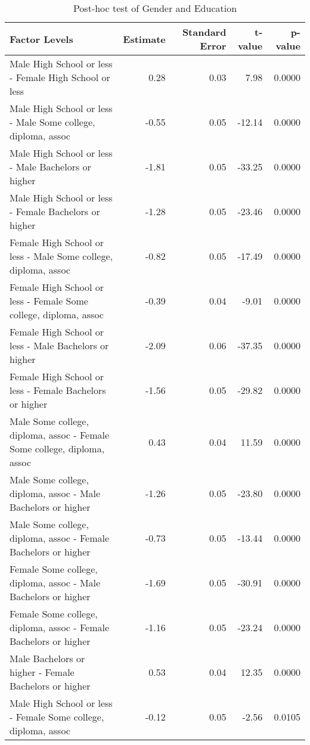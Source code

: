 \begin{table}[H]
\footnotesize
\centering
\begin{tabular}{lrrrr}
  \hline
Factor Levels & Estimate & Standard Error & t-value & p-value \\ 
  \hline
  Male High School or less -  Female High School or less & 0.28 & 0.03 & 7.98 & 0.0000 \\ 
    Male High School or less -  Male Some college, diploma, assoc & -0.55 & 0.05 & -12.14 & 0.0000 \\ 
    Male High School or less -  Male Bachelors or higher & -1.81 & 0.05 & -33.25 & 0.0000 \\ 
    Male High School or less -  Female Bachelors or higher & -1.28 & 0.05 & -23.46 & 0.0000 \\ 
    Female High School or less -  Male Some college, diploma, assoc & -0.82 & 0.05 & -17.49 & 0.0000 \\ 
    Female High School or less -  Female Some college, diploma, assoc & -0.39 & 0.04 & -9.01 & 0.0000 \\ 
    Female High School or less -  Male Bachelors or higher & -2.09 & 0.06 & -37.35 & 0.0000 \\ 
    Female High School or less -  Female Bachelors or higher & -1.56 & 0.05 & -29.82 & 0.0000 \\ 
    Male Some college, diploma, assoc -  Female Some college, diploma, assoc & 0.43 & 0.04 & 11.59 & 0.0000 \\ 
    Male Some college, diploma, assoc -  Male Bachelors or higher & -1.26 & 0.05 & -23.80 & 0.0000 \\ 
    Male Some college, diploma, assoc -  Female Bachelors or higher & -0.73 & 0.05 & -13.44 & 0.0000 \\ 
    Female Some college, diploma, assoc -  Male Bachelors or higher & -1.69 & 0.05 & -30.91 & 0.0000 \\ 
    Female Some college, diploma, assoc -  Female Bachelors or higher & -1.16 & 0.05 & -23.24 & 0.0000 \\ 
    Male Bachelors or higher -  Female Bachelors or higher & 0.53 & 0.04 & 12.35 & 0.0000 \\ 
    Male High School or less -  Female Some college, diploma, assoc & -0.12 & 0.05 & -2.56 & 0.0105 \\ 
   \hline
\end{tabular}
\caption{Post-hoc test of Gender and Education} 
\label{tab:gender_education}
\end{table}

